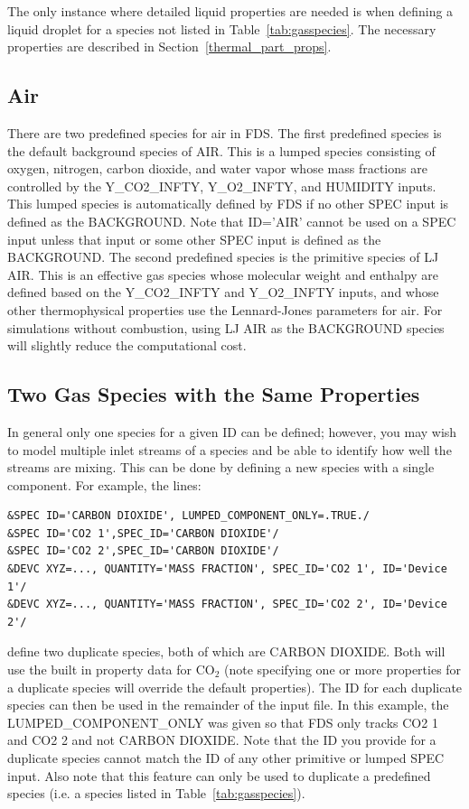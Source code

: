 \documentclass[11pt]{book}
\begin{document}
The only instance where detailed liquid properties are needed is when defining a liquid droplet for a species not listed in Table~\ref{tab:gasspecies}. The necessary properties are described in Section~\ref{thermal_part_props}.




\subsection{Air}

There are two predefined species for air in FDS. The first predefined species is the default background species of {\ct AIR}. This is a lumped species consisting of oxygen, nitrogen, carbon dioxide, and water vapor whose mass fractions are controlled by the {\ct Y\_CO2\_INFTY}, {\ct Y\_O2\_INFTY}, and {\ct HUMIDITY} inputs. This lumped species is automatically defined by FDS if no other {\ct SPEC} input is defined as the {\ct BACKGROUND}. Note that {\ct ID='AIR'} cannot be used on a {\ct SPEC} input unless that input or some other {\ct SPEC} input is defined as the {\ct BACKGROUND}. The second predefined species is the primitive species of {\ct LJ AIR}. This is an effective gas species whose molecular weight and enthalpy are defined based on the {\ct Y\_CO2\_INFTY} and {\ct Y\_O2\_INFTY} inputs, and whose other thermophysical properties use the Lennard-Jones parameters for air. For simulations without combustion, using {\ct LJ AIR} as the {\ct BACKGROUND} species will slightly reduce the computational cost.


\subsection{Two Gas Species with the Same Properties}
\label{info:SPEC_advanced}

In general only one species for a given {\ct ID} can be defined; however, you may wish to model multiple inlet streams of a species and be able to identify how well the streams are mixing.  This can be done by defining a new species with a single component.  For example, the lines:
\begin{lstlisting}
&SPEC ID='CARBON DIOXIDE', LUMPED_COMPONENT_ONLY=.TRUE./
&SPEC ID='CO2 1',SPEC_ID='CARBON DIOXIDE'/
&SPEC ID='CO2 2',SPEC_ID='CARBON DIOXIDE'/
&DEVC XYZ=..., QUANTITY='MASS FRACTION', SPEC_ID='CO2 1', ID='Device 1'/
&DEVC XYZ=..., QUANTITY='MASS FRACTION', SPEC_ID='CO2 2', ID='Device 2'/
\end{lstlisting}
define two duplicate species, both of which are {\ct CARBON DIOXIDE}.  Both will use the built in property data for CO$_2$ (note specifying one or more properties for a duplicate species will override the default properties).  The {\ct ID} for each duplicate species can then be used in the remainder of the input file.  In this example, the {\ct LUMPED\_COMPONENT\_ONLY} was given so that FDS only tracks {\ct CO2 1} and {\ct CO2 2} and not {\ct CARBON DIOXIDE}.  Note that the {\ct ID} you provide for a duplicate species cannot match the {\ct ID} of any other primitive or lumped {\ct SPEC} input.  Also note that this feature can only be used to duplicate a predefined species (i.e. a species listed in Table~\ref{tab:gasspecies}).
\end{document}
